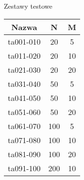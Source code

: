 \documentclass{beamer}
\begin{document}
\begin{frame}{Zestawy testowe}
  \begin{tabular}{ | c | c | c | }
      \hline                       
      Nazwa & N & M \\ \hline
      ta001-010 & 20 & 5 \\
      ta011-020 & 20 & 10 \\
      ta021-030 & 20 & 20 \\
      ta031-040 & 50 & 5 \\
      ta041-050 & 50 & 10 \\
      ta051-060 & 50 & 20 \\
      ta061-070 & 100 & 5 \\
      ta071-080 & 100 & 10 \\
      ta081-090 & 100 & 20 \\
      ta091-100 & 200 & 10 \\
      \hline
\end{tabular}
\end{frame}
\end{document}
